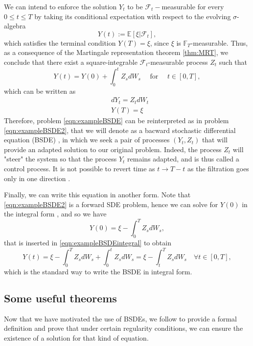 We can intend to enforce the solution $Y_t$ to be $\mathcal{F}_t-$measurable for every $0 \leq t \leq T $ by taking its conditional expectation with respect to the evolving $\sigma$-algebra
\begin{equation}
	Y(t):=\mathbb{E}[\xi|\mathcal{F}_t],
\end{equation}
which satisfies the terminal condition $Y(T)=\xi$, since $\xi$ is $\mathbb{F}_T$-measurable. Thus, as a consequence of the Martingale representation theorem \ref{thm:MRT}, we conclude that there exist a square-integrable $\mathcal{F}_t$-measurable process $Z_t$ such that 
\begin{equation}
	\label{eqn:exampleBSDEintegral}
	Y(t)=Y(0)+\int_{0}^{t}Z_sdW_s\quad \text{ for } \quad t\in [0,T],
\end{equation}
which can be written as 
\begin{equation}
	\label{eqn:exampleBSDE2}
	\begin{split}
		&dY_t=Z_tdW_t\\
		&Y(T)=\xi
	\end{split}
\end{equation}
Therefore, problem \eqref{eqn:exampleBSDE} can be reinterpreted as in problem \eqref{eqn:exampleBSDE2}, that we will denote as a bacward stochastic differential equation (BSDE) , in which we seek a pair of processes $(Y_t,Z_t)$ that will provide an adapted solution to our original problem. Indeed, the process $Z_t$ will "steer" the system so that the process $Y_t$ remains adapted, and is thus called a control process. It is not possible to revert time as $t\to T-t$ as the filtration goes only in one direction \cite{chessari_numerical_2022}.

Finally, we can write this equation in another form. Note that \eqref{eqn:exampleBSDE2} is a forward SDE problem, hence we can solve for $Y(0)$ in the integral form , and so we have
\begin{equation}
	Y(0)=\xi-\int_{0}^{T}Z_sdW_s,
\end{equation}
that is inserted in \eqref{eqn:exampleBSDEintegral} to obtain
\begin{equation}
	Y(t)=\xi-\int_{0}^{T}Z_sdW_s+\int_{0}^{t}Z_sdW_s=\xi -\int_{t}^{T}Z_sdW_s \quad \forall t\in[0,T],
\end{equation}
which is the standard way to write the BSDE in integral form.
\subsection{Some useful theorems}
Now that we have motivated the use of BSDEs, we follow \cite{pham_continuous-time_2009} to provide a formal definition and prove that under certain regularity conditions, we can ensure the existence of a solution for that kind of equation.

